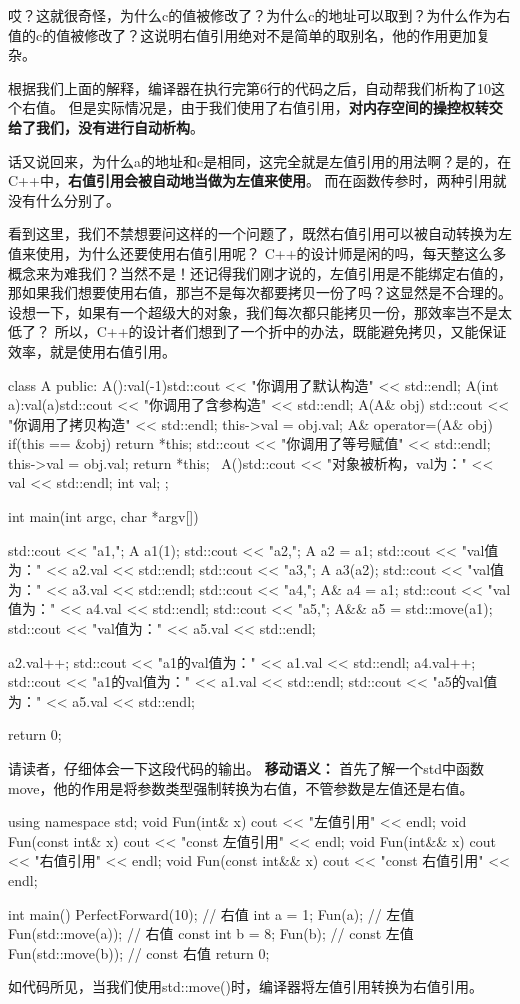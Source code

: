哎？这就很奇怪，为什么c的值被修改了？为什么c的地址可以取到？为什么作为右值的c的值被修改了？这说明右值引用绝对不是简单的取别名，他的作用更加复杂。

根据我们上面的解释，编译器在执行完第6行的代码之后，自动帮我们析构了10这个右值。
但是实际情况是，由于我们使用了右值引用，\textbf{对内存空间的操控权转交给了我们，没有进行自动析构}。

话又说回来，为什么a的地址和c是相同，这完全就是左值引用的用法啊？是的，在C++中，\textbf{右值引用会被自动地当做为左值来使用}。
而在函数传参时，两种引用就没有什么分别了。

看到这里，我们不禁想要问这样的一个问题了，既然右值引用可以被自动转换为左值来使用，为什么还要使用右值引用呢？
C++的设计师是闲的吗，每天整这么多概念来为难我们？当然不是！还记得我们刚才说的，左值引用是不能绑定右值的，
那如果我们想要使用右值，那岂不是每次都要拷贝一份了吗？这显然是不合理的。设想一下，如果有一个超级大的对象，我们每次都只能拷贝一份，那效率岂不是太低了？
所以，C++的设计者们想到了一个折中的办法，既能避免拷贝，又能保证效率，就是使用右值引用。
\begin{tcode}
class A{
public:
    A():val(-1){std::cout << "你调用了默认构造" << std::endl;}
    A(int a):val(a){std::cout << "你调用了含参构造" << std::endl;}
    A(A& obj){
        std::cout << "你调用了拷贝构造" << std::endl;
        this->val = obj.val;
    }
    A& operator=(A& obj){
        if(this == &obj)
            return *this;
        std::cout << "你调用了等号赋值" << std::endl;
        this->val = obj.val;
        return *this;
    }
    ~A(){std::cout << "对象被析构，val为：" << val << std::endl;}
    int val;
};

int main(int argc, char *argv[]) {
    std::cout << "a1,";
    A a1(1);
    std::cout << "a2,";
    A a2 = a1;
    std::cout << "val值为：" << a2.val << std::endl;
    std::cout << "a3,";
    A a3(a2);
    std::cout << "val值为：" << a3.val << std::endl;
    std::cout << "a4,";
    A& a4 = a1;
    std::cout << "val值为：" << a4.val << std::endl;
    std::cout << "a5,";
    A&& a5 = std::move(a1);
    std::cout << "val值为：" << a5.val << std::endl;

    a2.val++;
    std::cout << "a1的val值为：" << a1.val << std::endl;
    a4.val++;
    std::cout << "a1的val值为：" << a1.val << std::endl;
    std::cout << "a5的val值为：" << a5.val << std::endl;

    return 0;
}
\end{tcode}
请读者，仔细体会一下这段代码的输出。
\textbf{移动语义：}
首先了解一个std中函数move，他的作用是将参数类型强制转换为右值，不管参数是左值还是右值。
\begin{tcode}
using namespace std;
void Fun(int& x) { cout << "左值引用" << endl; }
void Fun(const int& x) { cout << "const 左值引用" << endl; }
void Fun(int&& x) { cout << "右值引用" << endl; }
void Fun(const int&& x) { cout << "const 右值引用" << endl; }

int main() {
    PerfectForward(10);           // 右值
    int a = 1;
    Fun(a);            // 左值
    Fun(std::move(a)); // 右值
    const int b = 8;
    Fun(b);      // const 左值
    Fun(std::move(b)); // const 右值
    return 0;
}
\end{tcode}
如代码所见，当我们使用std::move()时，编译器将左值引用转换为右值引用。

